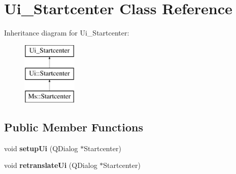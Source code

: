 \hypertarget{class_ui___startcenter}{}\section{Ui\+\_\+\+Startcenter Class Reference}
\label{class_ui___startcenter}
Inheritance diagram for Ui\+\_\+\+Startcenter\+:\begin{figure}[H]
\begin{center}
\leavevmode
\includegraphics[height=3.000000cm]{class_ui___startcenter}
\end{center}
\end{figure}
\subsection*{Public Member Functions}
\begin{DoxyCompactItemize}
\item 
\mbox{\label{class_ui___startcenter_aaec809f3ff9f9dbe9b2e6f7a87a06e1a}} 
void {\bfseries setup\+Ui} (Q\+Dialog $\ast$Startcenter)
\item 
\mbox{\label{class_ui___startcenter_ad58dbcd5f6e9d16b1938f8bd1fda5107}} 
void {\bfseries retranslate\+Ui} (Q\+Dialog $\ast$Startcenter)
\end{DoxyCompactItemize}
